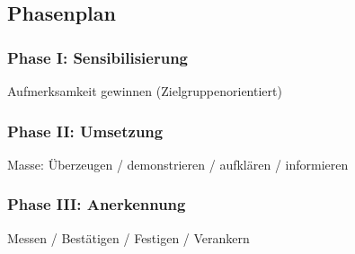 \documentclass[../../main.tex]{subfiles}
\begin{document}
\subsection{Phasenplan}
\subsubsection{Phase I: Sensibilisierung}
    Aufmerksamkeit gewinnen (Zielgruppenorientiert)
\subsubsection{Phase II: Umsetzung}
    Masse: Überzeugen / demonstrieren / aufklären / informieren
\subsubsection{Phase III: Anerkennung}
    Messen / Bestätigen / Festigen / Verankern
\end{document}
